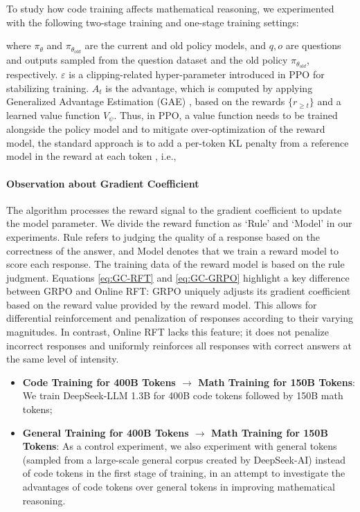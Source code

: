 To study how code training affects mathematical reasoning, we experimented with the following two-stage training and one-stage training settings:

where $\pi_{\theta}$ and $\pi_{\theta_{old}}$ are the current and old policy models, and $q, o$  are questions and outputs sampled from the question dataset and the old policy  $\pi_{\theta_{old}}$, respectively.  $\varepsilon$ is a clipping-related hyper-parameter introduced in PPO for stabilizing training.  $A_t$  is the advantage, which is computed by applying Generalized Advantage Estimation (GAE) \citep{gae}, based on the rewards  $\{r_{\ge t}\}$  and a learned value function  $V_{\psi}$. Thus, in PPO, a value function needs to be trained alongside the policy model and to mitigate over-optimization of the reward model, the standard approach is to add a per-token KL penalty from a reference model in the reward at each token \citep{ouyang2022training}, i.e.,

\paragraph{Observation about Gradient Coefficient} The algorithm processes the reward signal to the gradient coefficient to update the model parameter. We divide the reward function as `Rule' and `Model' in our experiments. Rule refers to judging the quality of a response based on the correctness of the answer, and Model denotes that we train a reward model to score each response. The training data of the reward model is based on the rule judgment. Equations \ref{eq:GC-RFT} and \ref{eq:GC-GRPO} highlight a key difference between GRPO and Online RFT: GRPO uniquely adjusts its gradient coefficient based on the reward value provided by the reward model. This allows for differential reinforcement and penalization of responses according to their varying magnitudes. In contrast, Online RFT lacks this feature; it does not penalize incorrect responses and uniformly reinforces all responses with correct answers at the same level of intensity. 

\begin{itemize}[topsep=0pt]
    \item \textbf{Code Training for 400B Tokens $\rightarrow$ Math Training for 150B Tokens}: We train DeepSeek-LLM 1.3B for 400B code tokens followed by 150B math tokens;
    \item \textbf{General Training for 400B Tokens $\rightarrow$ Math Training for 150B Tokens}: As a control experiment, we also experiment with general tokens (sampled from a large-scale general corpus created by DeepSeek-AI) instead of code tokens in the first stage of training, in an attempt to investigate the advantages of code tokens over general tokens in improving mathematical reasoning.
\end{itemize}

